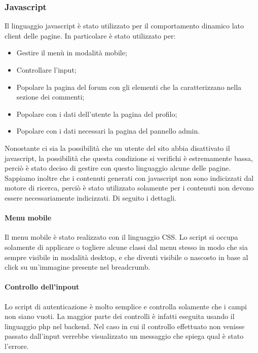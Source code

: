 \subsubsection{Javascript}\label{subs:js}

Il linguaggio javascript è stato utilizzato per il comportamento dinamico lato client delle pagine. In particolare è stato utilizzato per: 

\begin{itemize}
    
	\item Gestire il menù in modalità mobile;
    \item Controllare l'input;
	\item Popolare la pagina del forum con gli elementi che la caratterizzano nella sezione dei commenti;
	\item Popolare con i dati dell'utente la pagina del profilo;
	\item Popolare con i dati necessari la pagina del pannello admin.
	
\end{itemize}

Nonostante ci sia la possibilità che un utente del sito abbia disattivato il javascript, la possibilità che questa condizione si verifichi è estremamente bassa, perciò è stato deciso di gestire con questo linguaggio alcune delle pagine. 
Sappiamo inoltre che i contenuti generati con javascript non sono indicizzati dal motore di ricerca, perciò è stato utilizzato solamente per i contenuti non devono essere necessariamente indicizzati. Di seguito i dettagli.

\paragraph{Menu mobile}

Il menu mobile è stato realizzato con il linguaggio CSS. Lo script si occupa solamente di applicare o togliere alcune classi dal menu stesso in modo che sia sempre visibile in modalità desktop, e che diventi visibile o nascosto in base al click su un'immagine 
presente nel breadcrumb.

\paragraph{Controllo dell'inpout}

Lo script di autenticazione è molto semplice e controlla solamente che i campi non siano vuoti. La maggior parte dei controlli è infatti eseguita usando il linguaggio php nel backend. Nel caso in cui il controllo effettuato non venisse passato dall'input 
verrebbe visualizzato un messaggio che spiega qual è stato l'errore. 

